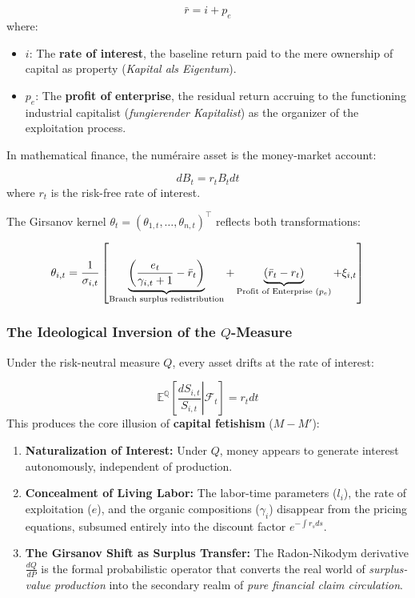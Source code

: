 \documentclass[11pt,letterpaper]{report}
\newcommand{\fitmath}[1]{\begingroup\setbox0=\hbox{$\displaystyle #1$}\ifdim\wd0>\linewidth\resizebox{\linewidth}{!}{$\displaystyle #1$}\else\displaystyle #1\fi\endgroup}
\begin{document}
\[
\bar{r}=i+{p}_{e}
\]
where:

\begin{itemize}
\item $i$: The \textbf{rate of interest}, the baseline return paid to the mere ownership of capital as property (\emph{Kapital als Eigentum}).
\item ${p}_{e}$: The \textbf{profit of enterprise}, the residual return accruing to the functioning industrial capitalist (\emph{fungierender Kapitalist}) as the organizer of the exploitation process.
\end{itemize}
In mathematical finance, the numéraire asset is the money-market account:

\[
d{B}_{t}={r}_{t}{B}_{t}dt
\]
where ${r}_{t}$ is the risk-free rate of interest.

The Girsanov kernel $\theta_t = (\theta_{1,t}, \dots, \theta_{n,t})^\top$ reflects both transformations:

\[\fitmath{\theta_{i,t} = \frac{1}{\sigma_{i,t}} \left[ \underbrace{\left(\frac{e_t}{\gamma_{i,t} + 1} - \bar{r}_t\right)}_{\text{Branch surplus redistribution}} + \underbrace{(\bar{r}_t - r_t)}_{\text{Profit of Enterprise } (p_e)} + \xi_{i,t} \right]}\]
\subsubsection{The Ideological Inversion of the $Q$-Measure}
Under the risk-neutral measure $Q$, every asset drifts at the rate of interest:

\[
\mathbb{E}^\mathbb{Q}\left[ \left. \frac{dS_{i,t}}{S_{i,t}} \right\vert{} \mathcal{F}_t \right] = r_t dt
\]
This produces the core illusion of \textbf{capital fetishism} ($M-M'$):

\begin{enumerate}
\item \textbf{Naturalization of Interest:} Under $Q$, money appears to generate interest autonomously, independent of production.
\item \textbf{Concealment of Living Labor:} The labor-time parameters (${l}_{i}$), the rate of exploitation ($e$), and the organic compositions (${\gamma }_{i}$) disappear from the pricing equations, subsumed entirely into the discount factor ${e}^{-\int{r}_{s}ds}$.
\item \textbf{The Girsanov Shift as Surplus Transfer:} The Radon-Nikodym derivative $\frac{dQ}{dP}$ is the formal probabilistic operator that converts the real world of \emph{surplus-value production} into the secondary realm of \emph{pure financial claim circulation}.
\end{enumerate}
\end{document}
